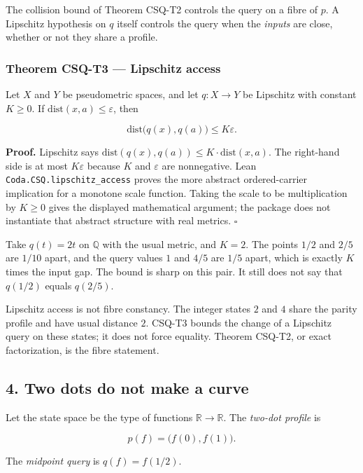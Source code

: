 \documentclass[
  11pt,
]{article}
\begin{document}
The collision bound of Theorem CSQ-T2 controls the query on a fibre of \(p\). A Lipschitz hypothesis on \(q\) itself controls the query when the \emph{inputs} are close, whether or not they share a profile.

\subsubsection{Theorem CSQ-T3 --- Lipschitz access}\label{theorem-csq-t3-lipschitz-access}

Let \(X\) and \(Y\) be pseudometric spaces, and let \(q:X\to Y\) be Lipschitz with constant \(K\ge 0\). If \(\mathrm{dist}(x,a)\le\varepsilon\), then

\[
\mathrm{dist}\bigl(q(x),q(a)\bigr)\le K\varepsilon.
\]

\textbf{Proof.} Lipschitz says \(\mathrm{dist}(q(x),q(a))\le K\cdot\mathrm{dist}(x,a)\). The right-hand side is at most \(K\varepsilon\) because \(K\) and \(\varepsilon\) are nonnegative. Lean \nolinkurl{Coda.CSQ.lipschitz_access} proves the more abstract ordered-carrier implication for a monotone scale function. Taking the scale to be multiplication by \(K\ge0\) gives the displayed mathematical argument; the package does not instantiate that abstract structure with real metrics. \(\square\)

Take \(q(t)=2t\) on \(\mathbb{Q}\) with the usual metric, and \(K=2\). The points \(1/2\) and \(2/5\) are \(1/10\) apart, and the query values \(1\) and \(4/5\) are \(1/5\) apart, which is exactly \(K\) times the input gap. The bound is sharp on this pair. It still does not say that \(q(1/2)\) equals \(q(2/5)\).

Lipschitz access is not fibre constancy. The integer states \(2\) and \(4\) share the parity profile and have usual distance \(2\). CSQ-T3 bounds the change of a Lipschitz query on these states; it does not force equality. Theorem CSQ-T2, or exact factorization, is the fibre statement.

\subsection{4. Two dots do not make a curve}\label{two-dots-do-not-make-a-curve}

Let the state space be the type of functions \(\mathbb{R}\to\mathbb{R}\). The \emph{two-dot profile} is

\[
p(f)=\bigl(f(0),f(1)\bigr).
\]

The \emph{midpoint query} is \(q(f)=f(1/2)\).
\end{document}
